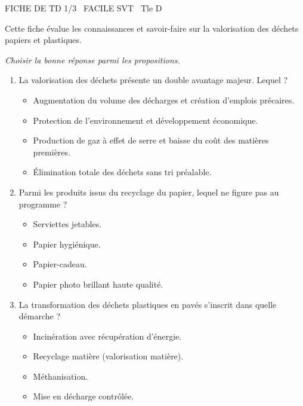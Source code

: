 \documentclass[11pt]{article}
\begin{document}
\begin{tcolorbox}[enhanced,colback=popink,colframe=popink,arc=10pt,boxrule=0pt,left=12pt,right=12pt,top=9pt,bottom=9pt]
{\color{white}\popxbold\small FICHE DE TD 1/3 \textbullet\ FACILE \hfill SVT \textbullet\ Tle D\par}
\end{tcolorbox}
\vspace{4pt}
Cette fiche évalue les connaissances et savoir-faire sur la valorisation des déchets papiers et plastiques.

\begin{exercice}
\emph{Choisir la bonne réponse parmi les propositions.}
\begin{enumerate}
    \item La valorisation des déchets présente un double avantage majeur. Lequel ?
    \begin{itemize}
        \item[A.] Augmentation du volume des décharges et création d'emplois précaires.
        \item[B.] Protection de l'environnement et développement économique.
        \item[C.] Production de gaz à effet de serre et baisse du coût des matières premières.
        \item[D.] Élimination totale des déchets sans tri préalable.
    \end{itemize}
    \item Parmi les produits issus du recyclage du papier, lequel ne figure pas au programme ?
    \begin{itemize}
        \item[A.] Serviettes jetables.
        \item[B.] Papier hygiénique.
        \item[C.] Papier-cadeau.
        \item[D.] Papier photo brillant haute qualité.
    \end{itemize}
    \item La transformation des déchets plastiques en pavés s'inscrit dans quelle démarche ?
    \begin{itemize}
        \item[A.] Incinération avec récupération d'énergie.
        \item[B.] Recyclage matière (valorisation matière).
        \item[C.] Méthanisation.
        \item[D.] Mise en décharge contrôlée.
    \end{itemize}
\end{enumerate}
\end{exercice}
\end{document}
